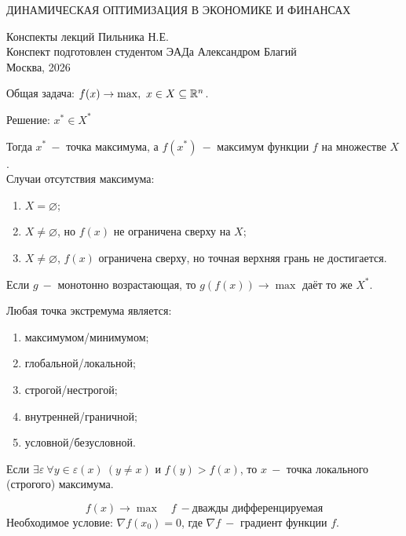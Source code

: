 \documentclass[a4paper,11pt]{article}
\begin{document}
\begin{center}
    \huge ДИНАМИЧЕСКАЯ ОПТИМИЗАЦИЯ В ЭКОНОМИКЕ И ФИНАНСАХ\\[10cm]
\end{center}
\begin{center}
    Конспекты лекций Пильника Н.Е.\\[2cm]

    Конспект подготовлен студентом ЭАДа Александром Благий\\[10cm]

    Москва, 2026
\end{center}
\newpage
\tableofcontents
\newpage
\begin{center}
\end{center}
Общая задача: $f(x) \to \max,\ x\in X \subseteq \mathbb{R}^n$.

Решение: $x^*\in X^*$

Тогда $x^*\ -$ точка максимума, а $f(x^*)\ -$ максимум функции $f$ на множестве $X$.\\[5mm]
Случаи отсутствия максимума:
\begin{enumerate}
    \item $X = \varnothing$;
    \item $X \neq \varnothing$, но $f(x)$ не ограничена сверху на $X$;
    \item $X \neq \varnothing$, $f(x)$ ограничена сверху, но точная верхняя грань не достигается.
\end{enumerate}
Если $g\ -$ монотонно возрастающая, то $g(f(x)) \to \max$ даёт то же $X^*$.

Любая точка экстремума является:
\begin{enumerate}
    \item максимумом/минимумом;
    \item глобальной/локальной;
    \item строгой/нестрогой;
    \item внутренней/граничной;
    \item условной/безусловной.
\end{enumerate}
Если $\exists \varepsilon \ \forall y\in \varepsilon(x)\ (y\neq x)$ и $f(y) > f(x)$, то $x\ -$ точка локального (строгого) максимума.

\[f(x) \to \max \quad f\ - \text{дважды дифференцируемая}\]
Необходимое условие: $\nabla f(x_0) = 0$, где $\nabla f\ -$ градиент функции $f$.
\end{document}
